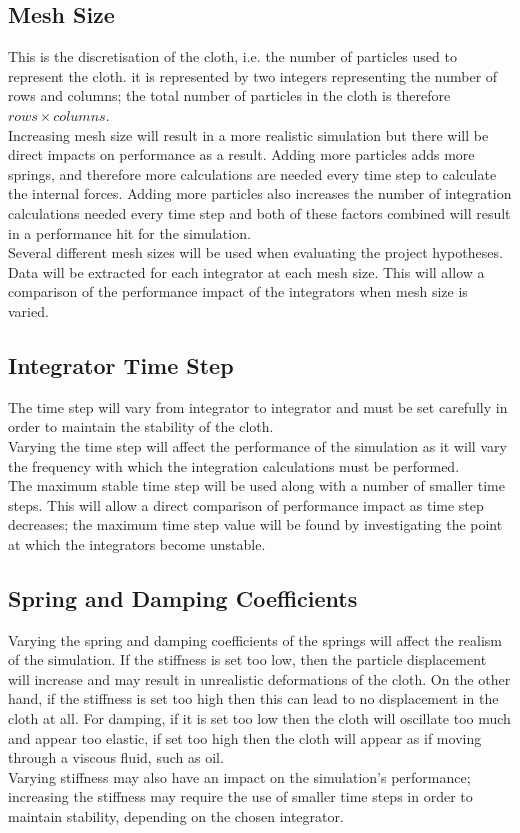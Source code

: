 \subsection{Mesh Size}
This is the discretisation of the cloth, i.e. the number of particles used to represent the cloth. it is represented by two integers representing the number of rows and columns; the total number of particles in the cloth is therefore $rows \times columns$.
\\Increasing mesh size will result in a more realistic simulation but there will be direct impacts on performance as a result. Adding more particles adds more springs, and therefore more calculations are needed every time step to calculate the internal forces. Adding more particles also increases the number of integration calculations needed every time step and both of these factors combined will result in a performance hit for the simulation.
\\Several different mesh sizes will be used when evaluating the project hypotheses. Data will be extracted for each integrator at each mesh size. This will allow a comparison of the performance impact of the integrators when mesh size is varied.

\subsection{Integrator Time Step}
The time step will vary from integrator to integrator and must be set carefully in order to maintain the stability of the cloth.
\\Varying the time step will affect the performance of the simulation as it will vary the frequency with which the integration calculations must be performed.
\\The maximum stable time step will be used along with a number of smaller time steps. This will allow a direct comparison of performance impact as time step decreases; the maximum time step value will be found by investigating the point at which the integrators become unstable.

\subsection{Spring and Damping Coefficients}
Varying the spring and damping coefficients of the springs will affect the realism of the simulation. If the stiffness is set too low, then the particle displacement will increase and may result in unrealistic deformations of the cloth. On the other hand, if the stiffness is set too high then this can lead to no displacement in the cloth at all. For damping, if it is set too low then the cloth will oscillate too much and appear too elastic, if set too high then the cloth will appear as if moving through a viscous fluid, such as oil.
\\Varying stiffness may also have an impact on the simulation's performance; increasing the stiffness may require the use of smaller time steps in order to maintain stability, depending on the chosen integrator.

